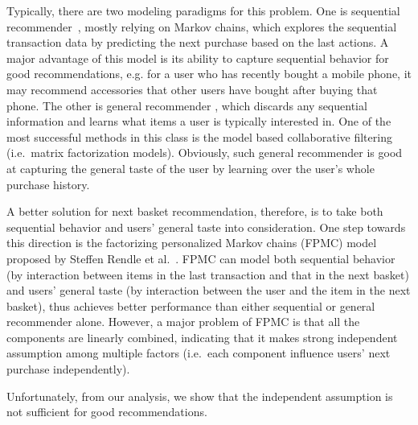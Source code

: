 \documentclass[10pt,journal,compsoc]{IEEEtran}
\begin{document}
Typically, there are two modeling paradigms for this problem. One is sequential recommender~\cite{Chen2012,Srikant1996s}, mostly relying on Markov chains, which explores the sequential transaction data by predicting the next purchase based on the last actions. A major advantage of this model is its ability to capture sequential behavior for good recommendations, e.g. for a user who has recently bought a mobile phone, it may recommend accessories that other users have bought after buying that phone.
The other is general recommender \cite{next,fpmc}, which discards any sequential information and learns what items a user is typically interested in. One of the most successful methods in this class is the model based collaborative filtering (i.e.~matrix factorization models). Obviously, such general recommender is good at capturing the general taste of the user by learning over the user's whole purchase history.

A better solution for next basket recommendation, therefore, is to take both sequential behavior and users' general taste into consideration. One step towards this direction is the factorizing personalized Markov chains (FPMC) model proposed by Steffen Rendle et al.~\cite{fpmc}. FPMC can model both sequential behavior (by interaction between items in the last transaction and that in the next basket) and users' general taste (by interaction between the user and the item in the next basket), thus achieves better performance than either sequential or general recommender alone.
However, a major problem of FPMC is that all the components are linearly combined, indicating that it makes strong independent assumption among multiple factors (i.e.~each component influence users' next purchase independently).

Unfortunately, from our analysis, we show that the independent assumption is not sufficient for good recommendations.
\end{document}
